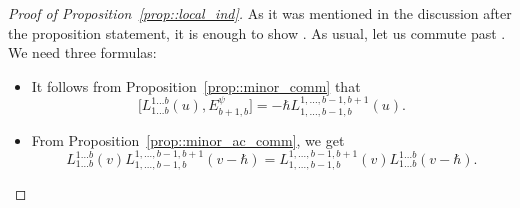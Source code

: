 \documentclass[10pt,a4paper]{article}
\numberwithin{equation}{section}
\newcommand{\calP}{\mathcal{P}}
\begin{document}
	\begin{proof}[Proof of Proposition~\ref{prop::local_ind}]
		As it was mentioned in the discussion after the proposition statement, it is enough to show
		\smash{$
		\calP_{b+1}(\vec{u}) E_{b+1,b}^{\psi} = 0$}.
		As usual, let us commute  past . We need three formulas:
		\begin{itemize}\itemsep=0pt
			\item It follows from Proposition~\ref{prop::minor_comm} that
			\begin{equation*}
				\bigl[L_{1\dots b}^{1\dots b}(u), E_{b+1,b}^{\psi}\bigr] = - \hbar L_{1,\dots,b-1,b}^{1,\dots,b-1,b+1}(u).
			\end{equation*}
			
			\item From Proposition~\ref{prop::minor_ac_comm}, we get
			\[
			L_{1\dots b}^{1\dots b}(v) L_{1,\dots,b-1,b}^{1,\dots,b-1,b+1}(v-\hbar) = L_{1,\dots,b-1,b}^{1,\dots,b-1,b+1}(v) L_{1\dots b}^{1\dots b}(v-\hbar).
			\]
			

\end{itemize}
\end{proof}
\end{document}
